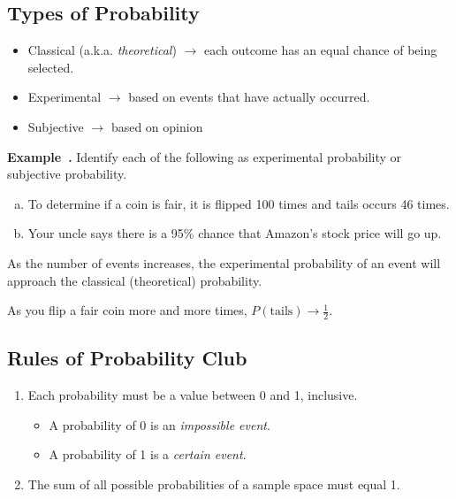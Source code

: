\documentclass{article}
\newcounter{example}[section]
\newenvironment{example}[1][]{\refstepcounter{example}\par\medskip
   {\color{red}\textbf{Example~\theexample. #1}}}{\medskip}
\begin{document}
\subsection*{Types of Probability}

\vspace{0.25in}

\begin{itemize}
    \item Classical (a.k.a. \textit{theoretical}) $\longrightarrow$ each outcome has an equal chance of being selected.
    \item Experimental $\longrightarrow$ based on events that have actually occurred.
    \item Subjective $\longrightarrow$ based on opinion
\end{itemize}

\vfill 

\begin{example}
Identify each of the following as experimental probability or subjective probability.
\begin{enumerate}[(a)]
    \item To determine if a coin is fair, it is flipped 100 times and tails occurs 46 times.    \vspace{0.5in}
    \item Your uncle says there is a 95\% chance that Amazon's stock price will go up.
\end{enumerate}
\end{example}

\vfill 

\begin{tcolorbox}[colframe=green!20!black, colback = green!30!white,title=\textbf{Law of Large Numbers}]
As the number of events increases, the experimental probability of an event will approach the classical (theoretical) probability.
\end{tcolorbox}
\vspace{0.25in}

As you flip a fair coin more and more times, $P(\text{tails}) \rightarrow \frac{1}{2}$.

\vfill 

\subsection*{Rules of Probability Club}

\begin{enumerate}
	\item Each probability must be a value between 0 and 1, inclusive.
	\begin{itemize}
		\item A probability of 0 is an \textit{impossible event}.
		\item A probability of 1 is a \textit{certain event}.
	\end{itemize}
	\item The sum of all possible probabilities of a sample space must equal 1.
\end{enumerate}
\end{document}
